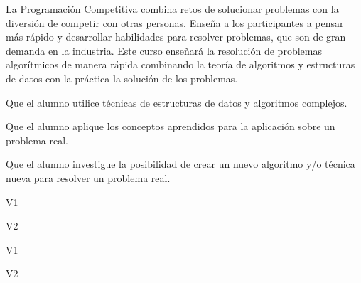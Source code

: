 \begin{syllabus}


\begin{justification}
La Programación Competitiva combina retos de solucionar problemas con la diversión de competir con otras personas. Enseña a los participantes a pensar más rápido y desarrollar habilidades para resolver problemas, que son de gran demanda en la industria. 
Este curso enseñará la resolución de problemas algorítmicos de manera rápida combinando la teoría de algoritmos y estructuras de datos con la práctica la solución de los problemas.
\end{justification}

\begin{goals}
\item Que el alumno utilice técnicas de estructuras de datos y algoritmos complejos.
\item Que el alumno aplique los conceptos aprendidos para la aplicación sobre un problema real.
\item Que el alumno investigue la posibilidad de crear un nuevo algoritmo y/o técnica nueva para resolver un problema real.
\end{goals}

\begin{outcomes}{V1}
    \item {}
    \item {}
    \item {}
\end{outcomes}

\begin{outcomes}{V2}
    \item {}
    \item {}
    \item {}
    \item {}
\end{outcomes}

\begin{competences}{V1}
    \item {}
    \item {}
    \item {}
\end{competences}

\begin{competences}{V2}
    \item {}
    \item {}
    \item {}
\end{competences}


\end{syllabus}
